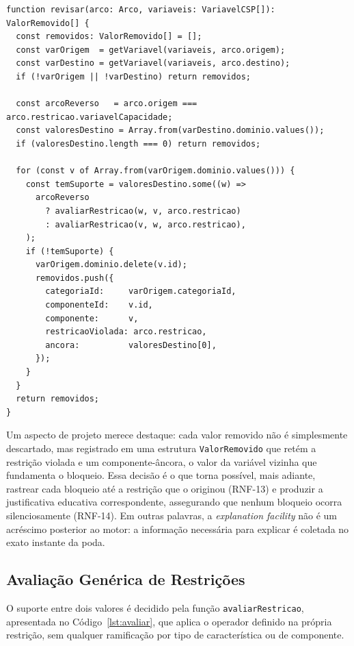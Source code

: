 \begin{lstlisting}[caption={Procedimento de revisão de arco do algoritmo AC-3},label={lst:revisar},basicstyle=\ttfamily\small]
function revisar(arco: Arco, variaveis: VariavelCSP[]): ValorRemovido[] {
  const removidos: ValorRemovido[] = [];
  const varOrigem  = getVariavel(variaveis, arco.origem);
  const varDestino = getVariavel(variaveis, arco.destino);
  if (!varOrigem || !varDestino) return removidos;

  const arcoReverso   = arco.origem === arco.restricao.variavelCapacidade;
  const valoresDestino = Array.from(varDestino.dominio.values());
  if (valoresDestino.length === 0) return removidos;

  for (const v of Array.from(varOrigem.dominio.values())) {
    const temSuporte = valoresDestino.some((w) =>
      arcoReverso
        ? avaliarRestricao(w, v, arco.restricao)
        : avaliarRestricao(v, w, arco.restricao),
    );
    if (!temSuporte) {
      varOrigem.dominio.delete(v.id);
      removidos.push({
        categoriaId:     varOrigem.categoriaId,
        componenteId:    v.id,
        componente:      v,
        restricaoViolada: arco.restricao,
        ancora:          valoresDestino[0],
      });
    }
  }
  return removidos;
}
\end{lstlisting}

Um aspecto de projeto merece destaque: cada valor removido não é simplesmente descartado, mas registrado em uma estrutura \texttt{ValorRemovido} que retém a restrição violada e um componente-âncora, o valor da variável vizinha que fundamenta o bloqueio. Essa decisão é o que torna possível, mais adiante, rastrear cada bloqueio até a restrição que o originou (RNF-13) e produzir a justificativa educativa correspondente, assegurando que nenhum bloqueio ocorra silenciosamente (RNF-14). Em outras palavras, a \textit{explanation facility} não é um acréscimo posterior ao motor: a informação necessária para explicar é coletada no exato instante da poda.

\subsection{Avaliação Genérica de Restrições}
\label{sub:impl-avaliador}
O suporte entre dois valores é decidido pela função \texttt{avaliarRestricao}, apresentada no Código~\ref{lst:avaliar}, que aplica o operador definido na própria restrição, sem qualquer ramificação por tipo de característica ou de componente.

